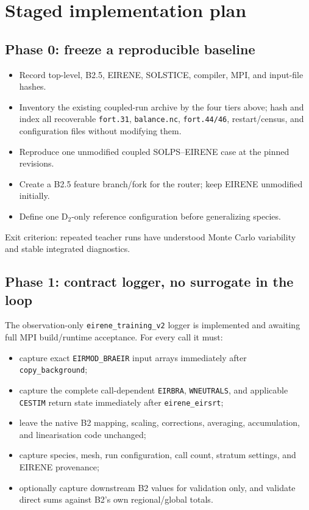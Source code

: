 \documentclass[11pt]{article}
\begin{document}
\section{Staged implementation plan}

\subsection{Phase 0: freeze a reproducible baseline}

\begin{itemize}
\item Record top-level, B2.5, EIRENE, SOLSTICE, compiler, MPI, and input-file hashes.
\item Inventory the existing coupled-run archive by the four tiers above; hash and index all recoverable \texttt{fort.31}, \texttt{balance.nc}, \texttt{fort.44/46}, restart/census, and configuration files without modifying them.
\item Reproduce one unmodified coupled SOLPS--EIRENE case at the pinned revisions.
\item Create a B2.5 feature branch/fork for the router; keep EIRENE unmodified initially.
\item Define one D$_2$-only reference configuration before generalizing species.
\end{itemize}

Exit criterion: repeated teacher runs have understood Monte Carlo variability and stable integrated diagnostics.

\subsection{Phase 1: contract logger, no surrogate in the loop}

The observation-only \texttt{eirene\_training\_v2} logger is implemented and
awaiting full MPI build/runtime acceptance. For every call it must:

\begin{itemize}
\item capture exact \texttt{EIRMOD\_BRAEIR} input arrays immediately after \texttt{copy\_background};
\item capture the complete call-dependent \texttt{EIRBRA}, \texttt{WNEUTRALS}, and applicable \texttt{CESTIM} return state immediately after \texttt{eirene\_eirsrt};
\item leave the native B2 mapping, scaling, corrections, averaging, accumulation, and linearisation code unchanged;
\item capture species, mesh, run configuration, call count, stratum settings, and EIRENE provenance;
\item optionally capture downstream B2 values for validation only, and validate direct sums against B2's own regional/global totals.
\end{itemize}
\end{document}
